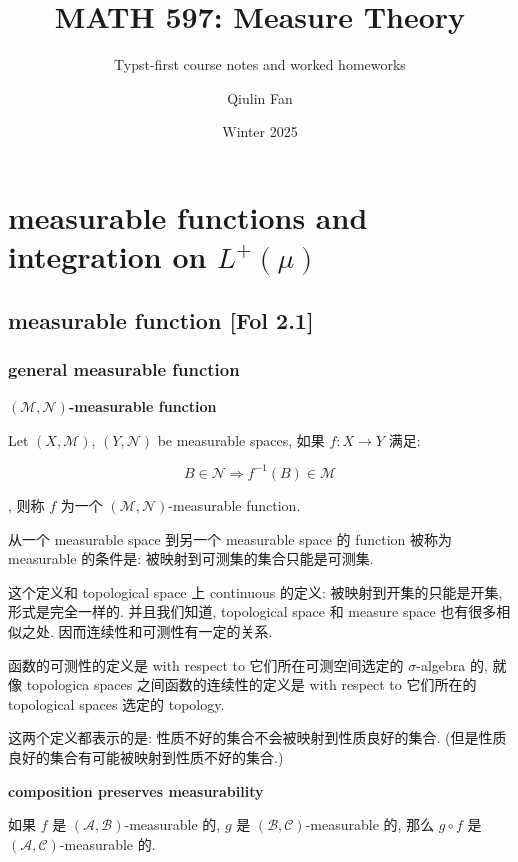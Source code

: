 \documentclass{qlnotes-export}
\title{MATH 597: Measure Theory}
\subtitle{Typst-first course notes and worked homeworks}
\author{Qiulin Fan}
\date{Winter 2025}
\begin{document}
\mainmatter
\chapter{\texorpdfstring{measurable functions and integration on \(L^{+}(\mu)\)}{measurable functions and integration on L\^{}\{+\}(\textbackslash mu)}}\label{measurable-functions-and-integration-on-lmu}

\section{measurable function {[}Fol 2.1{]}}

\subsection{general measurable function}\label{general-measurable-function}

\begin{definition}{\protect{}\label{kn-mathcal-m-mathcal-n-measurable-function}{\textbf{\((\mathcal{M},\mathcal{N})\)-measurable
function}}}

Let \((X,\mathcal{M})\), \((Y,\mathcal{N})\) be measurable spaces, 如果 \(f:X\rightarrow Y\) 满足:

\[B \in \mathcal{N}\Longrightarrow f^{- 1}(B) \in \mathcal{M}\]

, 则称 \(f\) 为一个 \((\mathcal{M},\mathcal{N})\)-measurable function.

\end{definition}

从一个 measurable space 到另一个 measurable space 的 function 被称为 measurable 的条件是: 被映射到可测集的集合只能是可测集.

这个定义和 topological space 上 continuous 的定义: 被映射到开集的只能是开集, 形式是完全一样的. 并且我们知道, topological space 和 measure space 也有很多相似之处. 因而连续性和可测性有一定的关系.

函数的可测性的定义是 with respect to 它们所在可测空间选定的 \(\sigma\)-algebra 的, 就像 topologica spaces 之间函数的连续性的定义是 with respect to 它们所在的 topological spaces 选定的 topology.

这两个定义都表示的是: 性质不好的集合不会被映射到性质良好的集合. (但是性质良好的集合有可能被映射到性质不好的集合.)

\begin{proposition}{\protect{}\label{kn-composition-preserves-measurability}{\textbf{composition
preserves measurability}}}

如果 \(f\) 是 \((\mathcal{A},\mathcal{B})\)-measurable 的, \(g\) 是 \((\mathcal{B},\mathcal{C})\)-measurable 的, 那么 \(g \circ f\) 是 \((\mathcal{A},\mathcal{C})\)-measurable 的.

\end{proposition}
\end{document}
